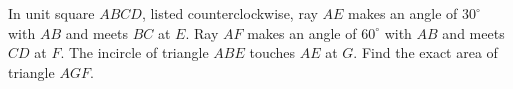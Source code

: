 In unit square $ABCD$, listed counterclockwise, ray $AE$ makes an angle of $30^\circ$ with $AB$ and meets $BC$ at $E$. Ray $AF$ makes an angle of $60^\circ$ with $AB$ and meets $CD$ at $F$. The incircle of triangle $ABE$ touches $AE$ at $G$. Find the exact area of triangle $AGF$.
